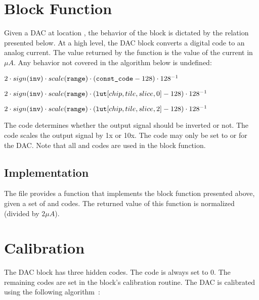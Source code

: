 \section{Block Function}\label{dac:blockfun}

Given a DAC at location , the behavior of the block
is dictated by the relation presented below. At a high level, the DAC block converts a
digital code to an analog current. The value returned by the function is the
value of the current in $\mu A$. Any behavior not covered in the algorithm
below is undefined:

\begin{algorithmic}

    \State $2 \cdot sign(\tx{inv}) \cdot scale(\tx{range}) \cdot (\tx{const_code}-128)\cdot 128^{-1}$

    \State $2 \cdot sign(\tx{inv}) \cdot scale(\tx{range}) \cdot (\tx{lut}\hindex{chip}{tile}{slice}{0}-128)\cdot 128^{-1}$

    \State $2 \cdot sign(\tx{inv}) \cdot scale(\tx{range}) \cdot (\tx{lut}\hindex{chip}{tile}{slice}{2}-128)\cdot 128^{-1}$
    \EndIf
 \EndIf
\end{algorithmic}

The  code determines whether the output signal should be inverted or
not. The  code scales the output signal by 1x or 10x. The 
code may only be set to  or  for the DAC. Note
that all \static and \dynamic codes are used in the block function.

\subsection{\analoglib Implementation}
The  file provides a  function that implements the
block function presented above, given a set of \dynamic and \static codes. The
returned value of this function is normalized (divided by $2 \mu A$).

\section{Calibration}
The DAC block has three hidden codes. The
 code is always set to $0$. The remaining codes are set in the block's
calibration routine. The DAC is calibrated using the following
algorithm~\cite{dac_calib.cpp}:

